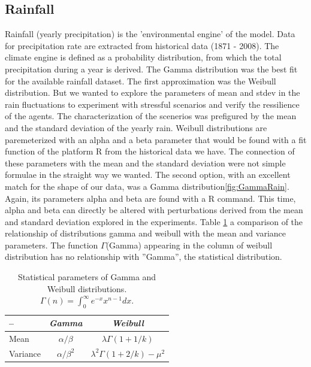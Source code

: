 \documentclass[11pt,oneside,a4paper,openright]{report}
\begin{document}
\subsection{Rainfall}

Rainfall (yearly precipitation) is the 'environmental engine' of the model. Data for precipitation rate are
extracted from historical data (1871 - 2008). The climate engine is defined as a probability distribution,
from which the total precipitation during a year is derived. The Gamma distribution was the best fit for
the available rainfall dataset. The first approximation was the Weibull distribution. But we wanted to explore
the parameters of mean and stdev in the rain fluctuations to experiment with stressful scenarios and verify
the ressilience of the agents. The characterization of the scenerios was prefigured by the mean and the 
standard deviation of the yearly rain. Weibull distributions are paremeterized with an alpha and a beta 
parameter that would be found with a fit function of the platform R from the historical data we have. The connection
of these parameters with the mean and the standard deviation were not simple formulae in the straight way we wanted. 
The second option, with an excellent match for the shape of our data, was a Gamma distribution\ref{fig:GammaRain}. Again, its parameters alpha and beta are found with a R command. This time, alpha and beta can directly be altered with perturbations derived from the mean and standard deviation explored in the experiments. Table \ref{tab:GammaVSWeibull} a comparison of the relationship of distributions gamma and weibull with the mean and variance parameters.
The function $\Gamma$(Gamma) appearing in the column of weibull distribution has no relationship with ''Gamma'', the statistical distribution. 


	\begin{table}[h]
	\centering
	\begin{tabular}{|l|c||c|}
		\hline
		--		&\emph{Gamma} 		& \emph{Weibull}\\
		\hline
		Mean		&$\alpha/\beta$		& $\lambda\Gamma(1+1/k)$ \\
		\hline
		Variance	&$\alpha/\beta^2$	& $\lambda^2\Gamma(1+2/k)-\mu^2$ \\
		\hline
	\end{tabular}
	\caption{Statistical parameters of Gamma and Weibull distributions.
		$\Gamma(n) = \int^{\infty}_{0} e^{-x}x^{n-1}dx$.    }
	\label{tab:GammaVSWeibull}
	\end{table}
\end{document}
